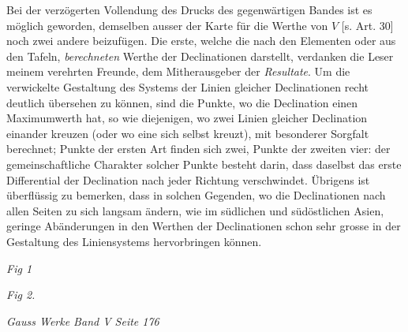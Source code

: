 Bei der verzögerten Vollendung des Drucks des gegenwärtigen Bandes ist es möglich geworden, demselben ausser der Karte für die Werthe von $V$ [s. Art. 30] noch zwei andere beizufügen. Die erste, welche die nach den Elementen oder aus den Tafeln, \textit{berechneten} Werthe der Declinationen darstellt, verdanken die Leser meinem verehrten Freunde, dem Mitherausgeber der \textit{Resultate}. Um die verwickelte Gestaltung des Systems der Linien gleicher Declinationen recht deutlich übersehen zu können, sind die Punkte, wo die Declination einen Maximumwerth hat, so wie diejenigen, wo zwei Linien gleicher Declination einander kreuzen (oder wo eine sich selbst kreuzt), mit besonderer Sorgfalt berechnet; Punkte der ersten Art finden sich zwei, Punkte der zweiten vier: der gemeinschaftliche Charakter solcher Punkte besteht darin, dass daselbst das erste Differential der Declination nach jeder Richtung verschwindet. Übrigens ist überflüssig zu bemerken, dass in solchen Gegenden, wo die Declinationen nach allen Seiten zu sich langsam ändern, wie im südlichen und südöstlichen Asien, geringe Abänderungen in den Werthen der Declinationen schon sehr grosse in der Gestaltung des Liniensystems hervorbringen können.

\clearpage
{}\thispagestyle{empty}
\begin{center}
\textit{Fig 1}\par\medskip
\resizebox{.89\linewidth}{!}{}
\par\bigskip
\textit{Fig 2.}\par\medskip
\resizebox{.89\linewidth}{!}{}
\end{center}
\noindent\textit{Gauss Werke Band V Seite 176}\par
\clearpage
\thispagestyle{empty}\null
\clearpage
